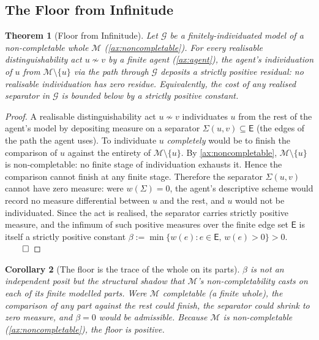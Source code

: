 \documentclass[11pt,a4paper]{article}
\theoremstyle{thmstyle}
\newtheorem{theorem}{Theorem}[section]
\newtheorem{corollary}[theorem]{Corollary}
\theoremstyle{definition}
\theoremstyle{remark}
\newcommand{\Graph}{\mathcal{G}}
\newcommand{\Edg}{\mathsf{E}}
\newcommand{\floor}{\beta}
\begin{document}
\subsection{The Floor from Infinitude}

\begin{theorem}[Floor from Infinitude]
\label{thm:floor_from_infinitude}
Let $\Graph$ be a finitely-individuated model of a non-completable
whole $\mathcal{M}$ (\cref{ax:noncompletable}). For every realisable
distinguishability act $u \not\sim v$ by a finite agent
(\cref{ax:agent}), the agent's individuation of $u$ from
$\mathcal{M}\setminus\{u\}$ via the path through $\Graph$ deposits a
strictly positive residual: no realisable individuation has zero
residue. Equivalently, the cost of any realised separator in
$\Graph$ is bounded below by a strictly positive constant.
\end{theorem}

\begin{proof}
A realisable distinguishability act $u \not\sim v$ individuates $u$
from the rest of the agent's model by depositing measure on a
separator $\Sigma(u, v) \subseteq \Edg$ (the edges of the path the
agent uses). To individuate $u$ \emph{completely} would be to
finish the comparison of $u$ against the entirety of
$\mathcal{M}\setminus\{u\}$. By \cref{ax:noncompletable},
$\mathcal{M}\setminus\{u\}$ is non-completable: no finite stage of
individuation exhausts it. Hence the comparison cannot finish at
any finite stage. Therefore the separator $\Sigma(u, v)$ cannot
have zero measure: were $w(\Sigma) = 0$, the agent's descriptive
scheme would record no measure differential between $u$ and the
rest, and $u$ would not be individuated. Since the act is realised,
the separator carries strictly positive measure, and the infimum of
such positive measures over the finite edge set $\Edg$ is itself a
strictly positive constant
$\floor := \min\{w(e) : e \in \Edg,\, w(e) > 0\} > 0$. $\qed$
\end{proof}

\begin{corollary}[The floor is the trace of the whole on its
parts]
\label{cor:floor_trace}
$\floor$ is not an independent posit but the structural shadow that
$\mathcal{M}$'s non-completability casts on each of its finite
modelled parts. Were $\mathcal{M}$ completable (a finite whole),
the comparison of any part against the rest could finish, the
separator could shrink to zero measure, and $\floor = 0$ would be
admissible. Because $\mathcal{M}$ is non-completable
(\cref{ax:noncompletable}), the floor is positive.
\end{corollary}
\end{document}
